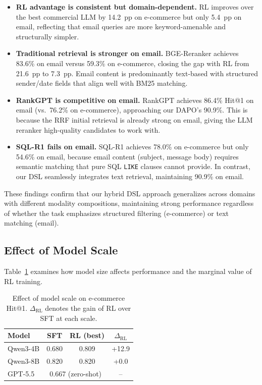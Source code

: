 \begin{itemize}[leftmargin=*,nosep]
\item \textbf{RL advantage is consistent but domain-dependent.} RL improves over the best commercial LLM by 14.2~pp on e-commerce but only 5.4~pp on email, reflecting that email queries are more keyword-amenable and structurally simpler.

\item \textbf{Traditional retrieval is stronger on email.} BGE-Reranker achieves 83.6\% on email versus 59.3\% on e-commerce, closing the gap with RL from 21.6~pp to 7.3~pp. Email content is predominantly text-based with structured sender/date fields that align well with BM25 matching.

\item \textbf{RankGPT is competitive on email.} RankGPT achieves 86.4\% Hit@1 on email (vs.\ 76.2\% on e-commerce), approaching our DAPO's 90.9\%. This is because the RRF initial retrieval is already strong on email, giving the LLM reranker high-quality candidates to work with.

\item \textbf{SQL-R1 fails on email.} SQL-R1 achieves 78.0\% on e-commerce but only 54.6\% on email, because email content (subject, message body) requires semantic matching that pure SQL \texttt{LIKE} clauses cannot provide. In contrast, our DSL seamlessly integrates text retrieval, maintaining 90.9\% on email.
\end{itemize}

These findings confirm that our hybrid DSL approach generalizes across domains with different modality compositions, maintaining strong performance regardless of whether the task emphasizes structured filtering (e-commerce) or text matching (email).


\subsection{Effect of Model Scale}
\label{sec:scaling}

Table~\ref{tab:scaling} examines how model size affects performance and the marginal value of RL training.

\begin{table}[t]
\centering
\small
\caption{Effect of model scale on e-commerce Hit@1. $\Delta_\text{RL}$ denotes the gain of RL over SFT at each scale.}
\label{tab:scaling}
\begin{tabular}{lccc}
\toprule
\textbf{Model} & \textbf{SFT} & \textbf{RL (best)} & \textbf{$\Delta_\text{RL}$} \\
\midrule
Qwen3-4B & 0.680 & 0.809 & +12.9 \\
Qwen3-8B & 0.820 & 0.820 & +0.0 \\
\midrule
GPT-5.5 & \multicolumn{2}{c}{0.667 (zero-shot)} & -- \\
\bottomrule
\end{tabular}
\end{table}

